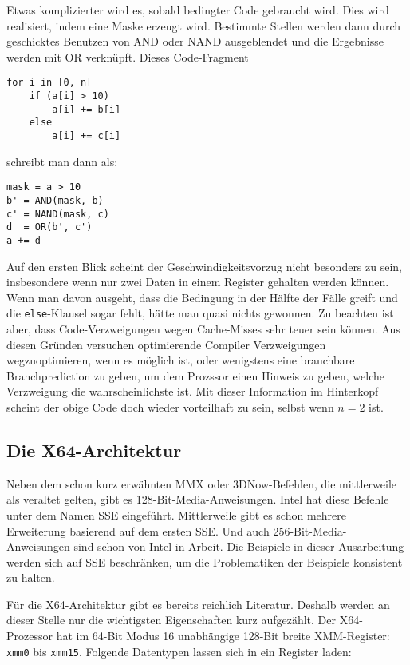 \documentclass[a4paper,10pt]{article}
\begin{document}
Etwas komplizierter wird es, sobald bedingter Code gebraucht wird. Dies wird realisiert, indem eine
Maske erzeugt wird. Bestimmte Stellen werden dann durch geschicktes Benutzen von AND oder NAND
ausgeblendet und die Ergebnisse werden mit OR verknüpft. Dieses Code-Fragment

\begin{verbatim}
for i in [0, n[
    if (a[i] > 10)
        a[i] += b[i]
    else
        a[i] += c[i]
\end{verbatim}
    
schreibt man dann als:

\begin{verbatim}
mask = a > 10
b' = AND(mask, b)
c' = NAND(mask, c)
d  = OR(b', c')
a += d
\end{verbatim}

Auf den ersten Blick scheint der Geschwindigkeitsvorzug nicht besonders zu sein, insbesondere wenn
nur zwei Daten in einem Register gehalten werden können. Wenn man davon ausgeht, dass die Bedingung
in der Hälfte der Fälle greift und die \texttt{else}-Klausel sogar fehlt, hätte man quasi nichts
gewonnen. Zu beachten ist aber, dass Code-Verzweigungen wegen Cache-Misses sehr teuer sein können.
Aus diesen Gründen versuchen optimierende Compiler Verzweigungen wegzuoptimieren, wenn es möglich
ist, oder wenigstens eine brauchbare Branchprediction zu geben, um dem Prozssor einen Hinweis zu
geben, welche Verzweigung die wahrscheinlichste ist. Mit dieser Information im Hinterkopf scheint
der obige Code doch wieder vorteilhaft zu sein, selbst wenn $n = 2$ ist.

\subsection{Die X64-Architektur}

Neben dem schon kurz erwähnten MMX oder 3DNow-Befehlen, die mittlerweile als veraltet gelten, gibt
es 128-Bit-Media-Anweisungen. Intel hat diese Befehle unter dem Namen SSE eingeführt.  Mittlerweile
gibt es schon mehrere Erweiterung basierend auf dem ersten SSE. Und auch 256-Bit-Media-Anweisungen
sind schon von Intel in Arbeit. Die Beispiele in dieser Ausarbeitung werden sich auf SSE
beschränken, um die Problematiken der Beispiele konsistent zu halten.

Für die X64-Architektur gibt es bereits reichlich Literatur. Deshalb werden an dieser Stelle nur die
wichtigsten Eigenschaften kurz aufgezählt. Der X64-Prozessor hat im 64-Bit Modus 16 unabhängige
128-Bit breite XMM-Register: \texttt{xmm0} bis \texttt{xmm15}. Folgende Datentypen lassen sich in
ein Register laden:
\end{document}
